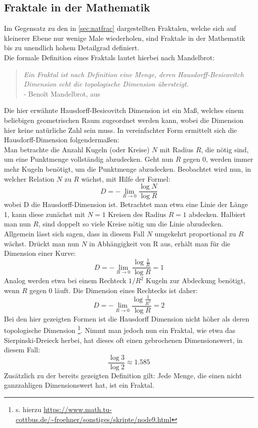 \documentclass[a4paper,12pt,onesided]{report}
\begin{document}
\subsection{Fraktale in der Mathematik}
Im Gegensatz zu den in \autoref{sec:natfrac} dargestellten Fraktalen, welche sich auf kleinerer Ebene nur wenige Male wiederholen, sind Fraktale in der Mathematik bis zu unendlich hohem Detailgrad definiert.\\
Die formale Definition eines Fraktals lautet hierbei nach Mandelbrot:

\begin{quotation}
	\textit{Ein Fraktal ist nach Definition eine Menge, deren  Hausdorff-Besicovitch Dimension echt die topologische Dimension übersteigt.}
	\\ - Benoît Mandelbrot, aus \cite[S. 27]{mandelbrot2013fraktale}
\end{quotation}
Die hier erwähnte Hausdorff-Besicovitch Dimension ist ein Maß, welches einem beliebigen geometrischen Raum zugeordnet werden kann, wobei die Dimension hier keine natürliche Zahl sein muss. In vereinfachter Form ermittelt sich die Hausdorff-Dimension folgendermaßen:\\
Man betrachte die Anzahl Kugeln (oder Kreise) $N$ mit Radius $R$, die nötig sind, um eine Punktmenge vollständig abzudecken.
Geht nun $R$ gegen 0, werden immer mehr Kugeln benötigt, um die Punktmenge abzudecken. Beobachtet wird nun, in welcher Relation $N$ zu $R$ wächst, mit Hilfe der Formel:
\[D = - \lim_{R \to 0} \frac{\log{N}}{\log{R}}\]
wobei D die Hausdorff-Dimension ist. Betrachtet man etwa eine Linie der Länge 1, kann diese zunächst mit $N = 1$ Kreisen des Radius $R = 1$ abdecken. Halbiert man nun $R$, sind doppelt so viele Kreise nötig um die Linie abzudecken. Allgemein lässt sich sagen, dass in diesem Fall $N$ umgekehrt proportional zu $R$ wächst. Drückt man nun $N$ in Abhängigkeit von R aus, erhält man für die Dimension einer Kurve:
\[D = - \lim_{R \to 0} \frac{\log{\frac{1}{R}}}{\log{R}} = 1\]
Analog werden etwa bei einem Rechteck $1/R^2$ Kugeln zur Abdeckung benötigt, wenn $R$ gegen 0 läuft. Die Dimension eines Rechtecks ist daher:
\[D = - \lim_{R \to 0} \frac{\log{\frac{1}{R^2}}}{\log{R}} = 2\]
Bei den hier gezeigten Formen ist die Hausdorff Dimension nicht höher als deren topologische Dimension \footnote{s. hierzu \url{https://www.math.tu-cottbus.de/~froehner/sonstiges/skripte/node9.html}}.
Nimmt man jedoch nun ein Fraktal, wie etwa das Sierpinski-Dreieck herbei, hat dieses oft einen gebrochenen Dimensionswert, in diesem Fall:
\[\frac{\log{3}}{\log{2}}\approx 1.585\]
Zusätzlich zu der bereits gezeigten Definition gilt:
Jede Menge, die einen nicht ganzzahligen Dimensionswert hat, ist ein Fraktal\cite[S. 27]{mandelbrot2013fraktale}.
\end{document}
